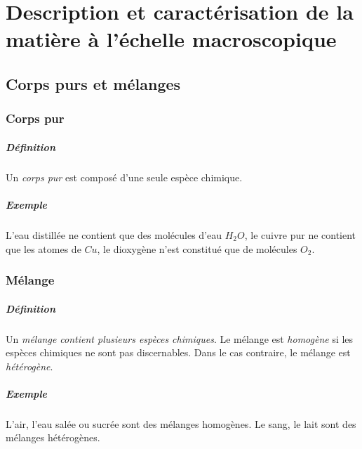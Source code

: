 \chapter{Description et caractérisation de la matière à l'échelle macroscopique}


\section{Corps purs et mélanges}

\subsection{Corps pur}
\paragraph{Définition} Un \textit{corps pur} est composé d'une seule espèce
chimique.
\paragraph{Exemple} L'eau distillée ne contient que des molécules d'eau
$H_2 O$, le cuivre pur ne contient que les atomes de $Cu$, le dioxygène
n'est constitué que de molécules $O_2$.

\subsection{Mélange} 
\paragraph{Définition} Un \textit{mélange contient plusieurs espèces chimiques}.
Le mélange est \textit{homogène} si les espèces chimiques ne sont
pas discernables. Dans le cas contraire, le mélange est \textit{hétérogène}.
\paragraph{Exemple} L'air, l'eau salée ou sucrée sont des mélanges homogènes.
Le sang, le lait sont des mélanges hétérogènes.


